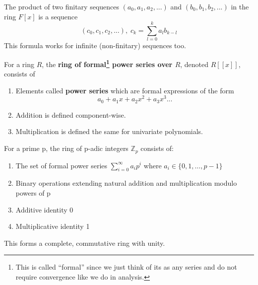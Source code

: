   The product of two finitary sequences $(a_0, a_1, a_2, ...)$ and $(b_0, b_1, b_2, ...)$ in the ring $F[x]$ is a sequence 
  \begin{equation}
    (c_0, c_1, c_2, ...), \; c_k = \sum_{l = 0}^{k} a_l b_{k-l}
  \end{equation}
  This formula works for infinite (non-finitary) sequences too. 

  \begin{definition}
    For a ring $R$, the \textbf{ring of formal\footnote{This is called ``formal'' since we just think of its as any series and do not require convergence like we do in analysis.} power series over $R$}, denoted $R[[x]]$, consists of 
    \begin{enumerate}
      \item Elements called \textbf{power series} which are formal expressions of the form 
      \begin{equation}
        a_0 + a_1 x + a_2 x^2 + a_3 x^3...
      \end{equation}

      \item Addition is defined component-wise. 

      \item Multiplication is defined the same for univariate polynomials. 
    \end{enumerate}
  \end{definition}

  \begin{definition}
    For a prime p, the ring of p-adic integers $\mathbb{Z}_p$ consists of:
    \begin{enumerate}
      \item The set of formal power series $\sum_{i=0}^{\infty} a_i p^i$ where $a_i \in \{0,1,\dots,p-1\}$
      \item Binary operations extending natural addition and multiplication modulo powers of p
      \item Additive identity 0
      \item Multiplicative identity 1
    \end{enumerate}
    This forms a complete, commutative ring with unity.
  \end{definition}


